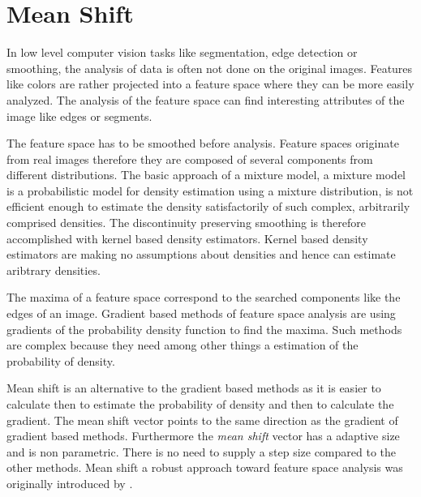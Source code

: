 \chapter{Mean Shift}\label{ch:mean_shift}
In low level computer vision tasks like segmentation, edge detection or
smoothing, the analysis of data is often not done on the original images.
Features like colors are rather projected into a feature space where they can be
more easily analyzed. The analysis of the feature space can find interesting
attributes of the image like edges or segments.

The feature space has to be smoothed before analysis. Feature spaces originate
from real images therefore they are composed of several components from
different distributions. The basic approach of a mixture model, a mixture model
is a probabilistic model for density estimation using a mixture distribution, is
not efficient enough to estimate the density satisfactorily of such complex,
arbitrarily comprised densities. The discontinuity preserving smoothing is therefore
accomplished with kernel based density estimators. Kernel based density estimators
are making no assumptions about densities and hence can estimate aribtrary 
densities.

The maxima of a feature space correspond to the searched components like the
edges of an image. Gradient based methods of feature space analysis are using
gradients of the probability density function to find the maxima. Such methods
are complex because they need among other things a estimation of the probability
of density.

Mean shift is an alternative to the gradient based methods as it is easier to
calculate then to estimate the probability of density and then to calculate the
gradient. The mean shift vector points to the same direction as the gradient of
gradient based methods. Furthermore the \emph{mean shift} vector has a adaptive
size and is non parametric. There is no need to supply a step size compared to
the other methods. Mean shift a robust approach toward feature space analysis
was originally introduced by \citeauthor{citeulike:462300}
\citep{citeulike:462300}.

